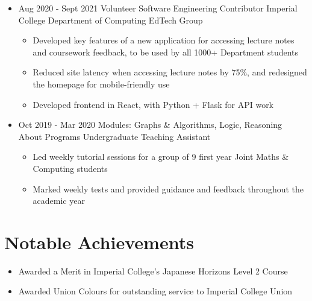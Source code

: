 \documentclass[11pt,a4paper,sans]{moderncv}        %
\begin{document}
\begin{itemize}

\item{
\cventry
{Aug 2020 - Sept 2021}
{Volunteer Software Engineering Contributor}
{Imperial College Department of Computing EdTech Group}
{}{}{
\begin{itemize}
\item Developed key features of a new application for accessing lecture notes and coursework feedback, to be used by all 1000+ Department students
\item Reduced site latency when accessing lecture notes by 75\%, and redesigned the homepage for mobile-friendly use
\item Developed frontend in React, with Python + Flask for API work
\end{itemize}
}}

\item{
\cventry
{Oct 2019 - Mar 2020}
{Modules: Graphs \& Algorithms, Logic, Reasoning About Programs}
{Undergraduate Teaching Assistant}
{}{}{
\begin{itemize}
\item Led weekly tutorial sessions for a group of 9 first year Joint Maths \& Computing students
\item Marked weekly tests and provided guidance and feedback throughout the academic year
\end{itemize}
}}

\end{itemize}

\section{Notable Achievements}

\begin{itemize}

\item Awarded a Merit in Imperial College's Japanese Horizons Level 2 Course

\item Awarded Union Colours for outstanding service to Imperial College Union

\end{itemize}

\nocite{*}

\end{document}
